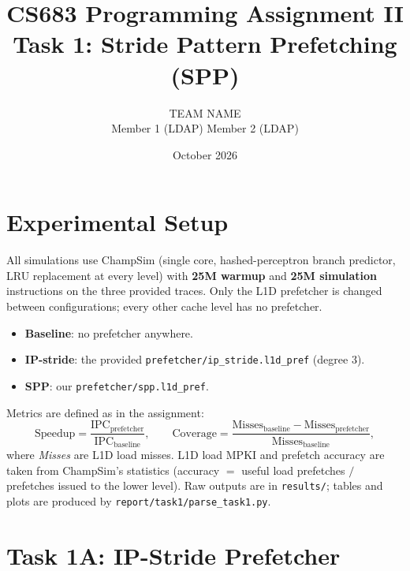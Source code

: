 \documentclass[11pt]{article}
\title{CS683 Programming Assignment II\\[4pt]
       \large Task 1: Stride Pattern Prefetching (SPP)}
\author{TEAM NAME \\ Member 1 (LDAP) \quad Member 2 (LDAP)}
\date{October 2026}
\begin{document}
\maketitle

\section*{Experimental Setup}
All simulations use ChampSim (single core, hashed-perceptron branch predictor, LRU
replacement at every level) with \textbf{25M warmup} and \textbf{25M simulation}
instructions on the three provided traces. Only the L1D prefetcher is changed
between configurations; every other cache level has no prefetcher.

\begin{itemize}
  \item \textbf{Baseline}: no prefetcher anywhere.
  \item \textbf{IP-stride}: the provided \texttt{prefetcher/ip\_stride.l1d\_pref} (degree 3).
  \item \textbf{SPP}: our \texttt{prefetcher/spp.l1d\_pref}.
\end{itemize}

Metrics are defined as in the assignment:
\[
\text{Speedup} = \frac{\text{IPC}_{\text{prefetcher}}}{\text{IPC}_{\text{baseline}}},\qquad
\text{Coverage} = \frac{\text{Misses}_{\text{baseline}} - \text{Misses}_{\text{prefetcher}}}{\text{Misses}_{\text{baseline}}},
\]
where \emph{Misses} are L1D load misses. L1D load MPKI and prefetch accuracy are
taken from ChampSim's statistics
(accuracy $=$ useful load prefetches $/$ prefetches issued to the lower level).
Raw outputs are in \texttt{results/}; tables and plots are produced by
\texttt{report/task1/parse\_task1.py}.

\section{Task 1A: IP-Stride Prefetcher}
\end{document}
